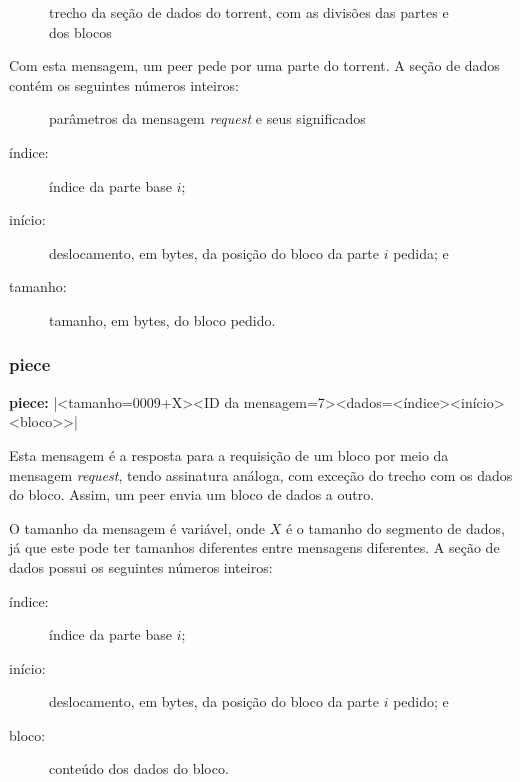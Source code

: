 \begin{figure}[H]
    \centering
    \caption{trecho da seção de dados do torrent, com as divisões das partes e dos
    blocos}
    \label{fig:partes}
\end{figure}

Com esta mensagem, um \gls*{peer} pede por uma parte do \gls*{torrent}. A seção de dados
contém os seguintes números inteiros:

\begin{figure}[ht!]
    \centering
    \caption{parâmetros da mensagem \emph{request} e seus significados}
    \label{fig:request}
\end{figure}

\begin{description}
    \item[índice:] índice da parte base $i$;
    \item[início:] deslocamento, em bytes, da posição do bloco da parte $i$ pedida; e
    \item[tamanho:] tamanho, em bytes, do bloco pedido.
\end{description}


\subsubsection*{piece}

\textbf{piece:} \bverb|<tamanho=0009+X><ID da mensagem=7><dados=<índice><início><bloco>>|

Esta mensagem é a resposta para a requisição de um bloco por meio da mensagem
\emph{request}, tendo assinatura análoga, com exceção do trecho com os dados do bloco.
Assim, um \gls*{peer} envia um bloco de dados a outro.

\newpage
O tamanho da mensagem é variável, onde $X$ é o tamanho do segmento de dados, já que
este pode ter tamanhos diferentes entre mensagens diferentes. A seção de dados possui
os seguintes números inteiros:

\begin{description}
    \item[índice:] índice da parte base $i$;
    \item[início:] deslocamento, em bytes, da posição do bloco da parte $i$ pedido; e
    \item[bloco:] conteúdo dos dados do bloco.
\end{description}

